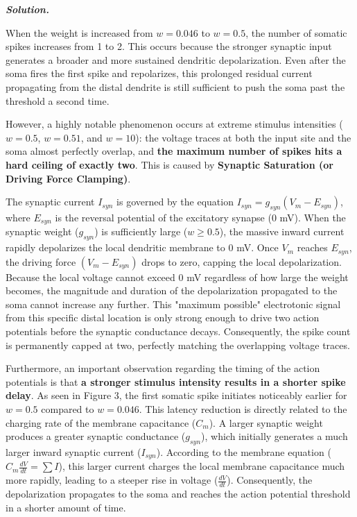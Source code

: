 \documentclass{article}
\newenvironment{solution}{%
    \par\noindent\begin{solutionbox}\textbf{\textit{Solution.}}\par\medskip\itshape
}{%
    \end{solutionbox}
}
\begin{document}
\begin{solution}
When the weight is increased from $w=0.046$ to $w=0.5$, the number of somatic spikes increases from 1 to 2. This occurs because the stronger synaptic input generates a broader and more sustained dendritic depolarization. Even after the soma fires the first spike and repolarizes, this prolonged residual current propagating from the distal dendrite is still sufficient to push the soma past the threshold a second time. 

However, a highly notable phenomenon occurs at extreme stimulus intensities ($w=0.5$, $w=0.51$, and $w=10$): the voltage traces at both the input site and the soma almost perfectly overlap, and \textbf{the maximum number of spikes hits a hard ceiling of exactly two}. This is caused by \textbf{Synaptic Saturation (or Driving Force Clamping)}. 

The synaptic current $I_{syn}$ is governed by the equation $I_{syn} = g_{syn}(V_m - E_{syn})$, where $E_{syn}$ is the reversal potential of the excitatory synapse ($0$ mV). When the synaptic weight ($g_{syn}$) is sufficiently large ($w \ge 0.5$), the massive inward current rapidly depolarizes the local dendritic membrane to $0$ mV. Once $V_m$ reaches $E_{syn}$, the driving force $(V_m - E_{syn})$ drops to zero, capping the local depolarization. Because the local voltage cannot exceed $0$ mV regardless of how large the weight becomes, the magnitude and duration of the depolarization propagated to the soma cannot increase any further. This "maximum possible" electrotonic signal from this specific distal location is only strong enough to drive two action potentials before the synaptic conductance decays. Consequently, the spike count is permanently capped at two, perfectly matching the overlapping voltage traces.

Furthermore, an important observation regarding the timing of the action potentials is that \textbf{a stronger stimulus intensity results in a shorter spike delay}. As seen in Figure 3, the first somatic spike initiates noticeably earlier for $w=0.5$ compared to $w=0.046$. This latency reduction is directly related to the charging rate of the membrane capacitance ($C_m$). A larger synaptic weight produces a greater synaptic conductance ($g_{syn}$), which initially generates a much larger inward synaptic current ($I_{syn}$). According to the membrane equation ($C_m \frac{dV}{dt} = \sum I$), this larger current charges the local membrane capacitance much more rapidly, leading to a steeper rise in voltage ($\frac{dV}{dt}$). Consequently, the depolarization propagates to the soma and reaches the action potential threshold in a shorter amount of time.


\end{solution}
\end{document}
